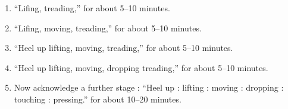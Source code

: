 \documentclass[a5paper,10pt,english]{book}
\begin{document}
\begin{enumerate}
\begin{enumerate}
\item {} 
\sphinxAtStartPar
“Lifing, treading,” for about 5–10 minutes.

\item {} 
\sphinxAtStartPar
“Lifing, moving, treading,” for about 5–10 minutes.

\item {} 
\sphinxAtStartPar
“Heel up lifting, moving, treading,” for about 5–10 minutes.

\item {} 
\sphinxAtStartPar
“Heel up lifting, moving, dropping treading,” for about 5–10 minutes.

\item {} 
\sphinxAtStartPar
Now acknowledge a further stage : “Heel up : lifting : moving : dropping : touching : pressing.” for about 10–20 minutes.

\end{enumerate}

\end{enumerate}
\end{document}
